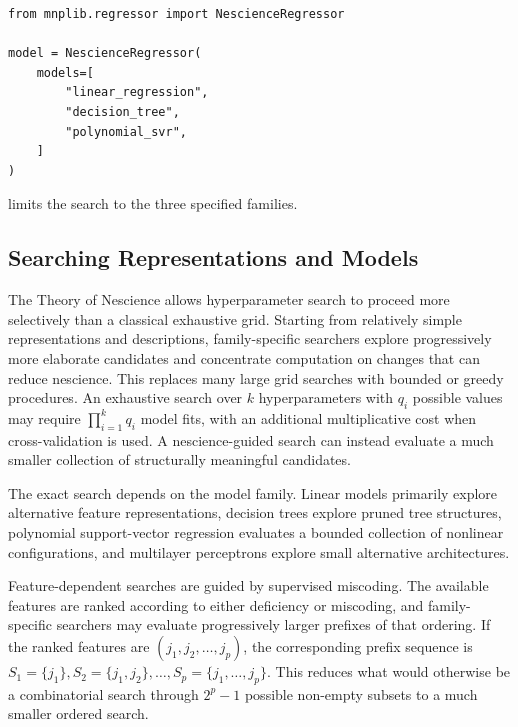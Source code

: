 \begin{sourcecode}
{\scriptsize
\begin{verbatim}
from mnplib.regressor import NescienceRegressor

model = NescienceRegressor(
    models=[
        "linear_regression",
        "decision_tree",
        "polynomial_svr",
    ]
)
\end{verbatim}}
\end{sourcecode}

limits the search to the three specified families.


\subsection*{Searching Representations and Models}

The Theory of Nescience allows hyperparameter search to proceed more selectively than a classical exhaustive grid. Starting from relatively simple representations and descriptions, family-specific searchers explore progressively more elaborate candidates and concentrate computation on changes that can reduce nescience. This replaces many large grid searches with bounded or greedy procedures. An exhaustive search over $k$ hyperparameters with $q_i$ possible values may require $\prod_{i=1}^{k}q_i$ model fits, with an additional multiplicative cost when cross-validation is used. A nescience-guided search can instead evaluate a much smaller collection of structurally meaningful candidates.

The exact search depends on the model family. Linear models primarily explore alternative feature representations, decision trees explore pruned tree structures, polynomial support-vector regression evaluates a bounded collection of nonlinear configurations, and multilayer perceptrons explore small alternative architectures.

Feature-dependent searches are guided by supervised miscoding. The available features are ranked according to either deficiency or miscoding, and family-specific searchers may evaluate progressively larger prefixes of that ordering. If the ranked features are $(j_1, j_2, \ldots, j_p)$, the corresponding prefix sequence is $S_1=\{j_1\}, S_2=\{j_1,j_2\}, \ldots, S_p=\{j_1,\ldots,j_p\}$. This reduces what would otherwise be a combinatorial search through $2^p-1$ possible non-empty subsets to a much smaller ordered search.

